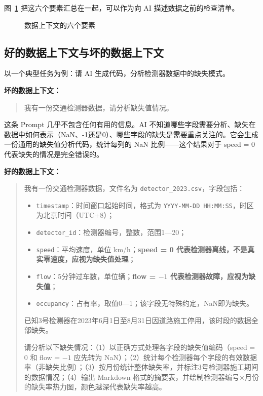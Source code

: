 图~\ref{fig:ch04_context} 把这六个要素汇总在一起，可以作为向 AI 描述数据之前的检查清单。

\begin{figure}[H]
  \centering
  \caption{数据上下文的六个要素}
  \label{fig:ch04_context}
\end{figure}

\subsection{好的数据上下文与坏的数据上下文}

以一个典型任务为例：请 AI 生成代码，分析检测器数据中的缺失模式。

\textbf{坏的数据上下文：}

\begin{quote}
我有一份交通检测器数据，请分析缺失值情况。
\end{quote}

这条 Prompt 几乎不包含任何有用的信息。AI 不知道哪些字段需要分析、缺失在数据中如何表示（NaN、-1还是0）、哪些字段的缺失是需要重点关注的。它会生成一份通用的缺失值分析代码，统计每列的 NaN 比例——这个结果对于 speed = 0 代表缺失的情况是完全错误的。

\textbf{好的数据上下文：}

\begin{quote}
我有一份交通检测器数据，文件名为 \texttt{detector\_2023.csv}，字段包括：
\begin{itemize}
  \item \texttt{timestamp}：时间窗口起始时间，格式为 \texttt{YYYY-MM-DD HH:MM:SS}，时区为北京时间（UTC+8）；
  \item \texttt{detector\_id}：检测器编号，整数，范围1—20；
  \item \texttt{speed}：平均速度，单位 km/h；\textbf{speed = 0 代表检测器离线，不是真实零速度，应视为缺失值处理}；
  \item \texttt{flow}：5分钟过车数，单位辆；\textbf{flow = $-1$ 代表检测器故障，应视为缺失值}；
  \item \texttt{occupancy}：占有率，取值0—1；该字段无特殊约定，NaN即为缺失。
\end{itemize}
已知3号检测器在2023年6月1日至8月31日因道路施工停用，该时段的数据全部缺失。

请分析以下缺失情况：（1）以正确方式处理各字段的缺失值编码（speed = 0 和 flow = $-1$ 应先转为 NaN）；（2）统计每个检测器每个字段的有效数据率（非缺失比例）；（3）按月份统计整体缺失率，并标注3号检测器施工期间的数据情况；（4）输出 Markdown 格式的摘要表，并绘制检测器编号×月份的缺失率热力图，颜色越深代表缺失率越高。
\end{quote}

